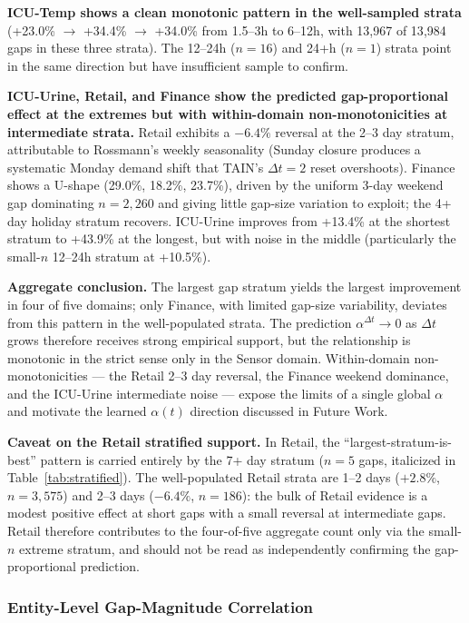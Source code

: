 \documentclass[11pt,a4paper]{article}
\begin{document}
\textbf{ICU-Temp shows a clean monotonic pattern in the well-sampled strata}
(+23.0\% $\to$ +34.4\% $\to$ +34.0\% from 1.5--3h to 6--12h, with 13{,}967 of
13{,}984 gaps in these three strata). The 12--24h ($n=16$) and 24+h ($n=1$)
strata point in the same direction but have insufficient sample to confirm.

\textbf{ICU-Urine, Retail, and Finance show the predicted gap-proportional
effect at the extremes but with within-domain non-monotonicities at intermediate
strata.} Retail exhibits a $-6.4\%$ reversal at the 2--3 day stratum, attributable
to Rossmann's weekly seasonality (Sunday closure produces a systematic Monday
demand shift that TAIN's $\Delta t = 2$ reset overshoots). Finance shows a
U-shape (29.0\%, 18.2\%, 23.7\%), driven by the uniform 3-day weekend gap
dominating $n = 2{,}260$ and giving little gap-size variation to exploit;
the 4+ day holiday stratum recovers. ICU-Urine improves from +13.4\% at the
shortest stratum to +43.9\% at the longest, but with noise in the middle
(particularly the small-$n$ 12--24h stratum at +10.5\%).

\textbf{Aggregate conclusion.} The largest gap stratum yields the largest
improvement in four of five domains; only Finance, with limited gap-size
variability, deviates from this pattern in the well-populated strata. The
prediction $\alpha^{\Delta t} \to 0$ as $\Delta t$ grows therefore receives
strong empirical support, but the relationship is monotonic in the strict sense
only in the Sensor domain. Within-domain non-monotonicities --- the Retail 2--3
day reversal, the Finance weekend dominance, and the ICU-Urine intermediate
noise --- expose the limits of a single global $\alpha$ and motivate the
learned $\alpha(t)$ direction discussed in Future Work.

\textbf{Caveat on the Retail stratified support.} In Retail, the
``largest-stratum-is-best'' pattern is carried entirely by the 7+ day stratum
($n=5$ gaps, italicized in Table~\ref{tab:stratified}). The well-populated
Retail strata are 1--2 days ($+2.8\%$, $n=3{,}575$) and 2--3 days ($-6.4\%$,
$n=186$): the bulk of Retail evidence is a modest positive effect at short
gaps with a small reversal at intermediate gaps. Retail therefore contributes
to the four-of-five aggregate count only via the small-$n$ extreme stratum,
and should not be read as independently confirming the gap-proportional
prediction.

\subsubsection{Entity-Level Gap-Magnitude Correlation}
\label{sec:gap-correlation}
\end{document}
